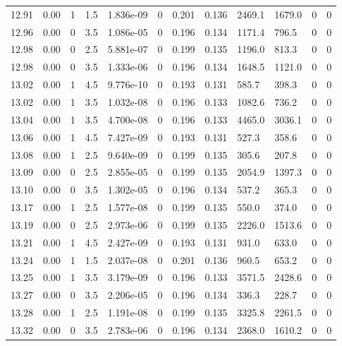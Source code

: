 \documentclass[preview]{standalone}
\begin{document}
{{{{{{{{{{{{{\begin{tabular}{L{1.2cm}C{1.2cm} C{0.3cm}C{0.5cm} C{1.4cm}C{1.4cm} C{1.4cm}C{1.4cm} C{1.6cm}C{1.6cm} C{1.6cm}C{1.6cm}}
  12.91  &  0.00  & 1     & 1.5 &  1.836e-09  & 0  &  0.201&   0.136& 2469.1 & 1679.0   &  0 & 0  \\ 
  12.96  &  0.00  & 0     & 3.5 &  1.086e-05  & 0  &  0.196&   0.134& 1171.4 & 796.5   &  0 & 0  \\ 
  12.98  &  0.00  & 0     & 2.5 &  5.881e-07  & 0  &  0.199&   0.135& 1196.0 & 813.3   &  0 & 0  \\ 
  12.98  &  0.00  & 0     & 3.5 &  1.333e-06  & 0  &  0.196&   0.134& 1648.5 & 1121.0   &  0 & 0  \\ 
  13.02  &  0.00  & 1     & 4.5 &  9.776e-10  & 0  &  0.193&   0.131& 585.7 & 398.3   &  0 & 0  \\ 
  13.02  &  0.00  & 1     & 3.5 &  1.032e-08  & 0  &  0.196&   0.133& 1082.6 & 736.2   &  0 & 0  \\ 
  13.04  &  0.00  & 1     & 3.5 &  4.700e-08  & 0  &  0.196&   0.133& 4465.0 & 3036.1   &  0 & 0  \\ 
  13.06  &  0.00  & 1     & 4.5 &  7.427e-09  & 0  &  0.193&   0.131& 527.3 & 358.6   &  0 & 0  \\ 
  13.08  &  0.00  & 1     & 2.5 &  9.640e-09  & 0  &  0.199&   0.135& 305.6 & 207.8   &  0 & 0  \\ 
  13.09  &  0.00  & 0     & 2.5 &  2.855e-05  & 0  &  0.199&   0.135& 2054.9 & 1397.3   &  0 & 0  \\ 
  13.10  &  0.00  & 0     & 3.5 &  1.302e-05  & 0  &  0.196&   0.134& 537.2 & 365.3   &  0 & 0  \\ 
  13.17  &  0.00  & 1     & 2.5 &  1.577e-08  & 0  &  0.199&   0.135& 550.0 & 374.0   &  0 & 0  \\ 
  13.19  &  0.00  & 0     & 2.5 &  2.973e-06  & 0  &  0.199&   0.135& 2226.0 & 1513.6   &  0 & 0  \\ 
  13.21  &  0.00  & 1     & 4.5 &  2.427e-09  & 0  &  0.193&   0.131& 931.0 & 633.0   &  0 & 0  \\ 
  13.24  &  0.00  & 1     & 1.5 &  2.037e-08  & 0  &  0.201&   0.136& 960.5 & 653.2   &  0 & 0  \\ 
  13.25  &  0.00  & 1     & 3.5 &  3.179e-09  & 0  &  0.196&   0.133& 3571.5 & 2428.6   &  0 & 0  \\ 
  13.27  &  0.00  & 0     & 3.5 &  2.206e-05  & 0  &  0.196&   0.134& 336.3 & 228.7   &  0 & 0  \\ 
  13.28  &  0.00  & 1     & 2.5 &  1.191e-08  & 0  &  0.199&   0.135& 3325.8 & 2261.5   &  0 & 0  \\ 
  13.32  &  0.00  & 0     & 3.5 &  2.783e-06  & 0  &  0.196&   0.134& 2368.0 & 1610.2   &  0 & 0  \\ 

\end{tabular}}}}}}}}}}}}}}
\end{document}
